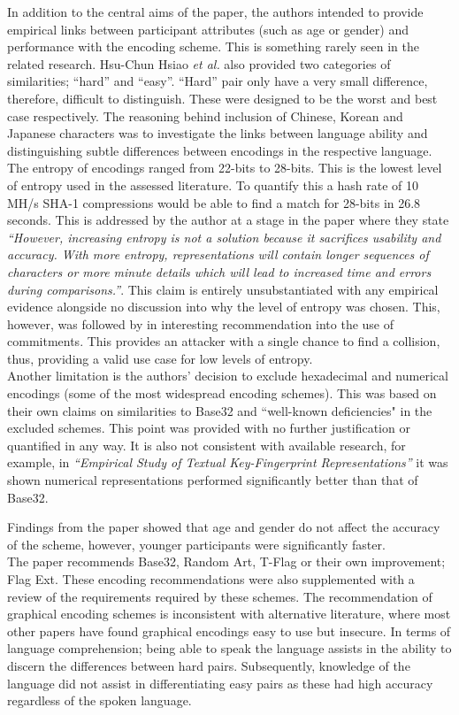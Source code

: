 In addition to the central aims of the paper, the authors intended to provide empirical links between participant attributes (such as age or gender) and performance with the encoding scheme. This is something rarely seen in the related research. Hsu-Chun Hsiao \textit{et al.} also provided two categories of similarities; ``hard'' and ``easy''. ``Hard'' pair only have a very small difference, therefore, difficult to distinguish. These were designed to be the worst and best case respectively. The reasoning behind inclusion of Chinese, Korean and Japanese characters was to investigate the links between language ability and distinguishing subtle differences between encodings in the respective language. The entropy of encodings ranged from 22-bits to 28-bits. This is the lowest level of entropy used in the assessed literature. To quantify this a hash rate of 10 MH/s SHA-1 compressions would be able to find a match for 28-bits in 26.8 seconds. This is addressed by the author at a stage in the paper where they state \textit{``However, increasing entropy is not a solution because it sacrifices usability and accuracy. With more entropy, representations will contain longer sequences of characters or more minute details which will lead to increased time and errors during comparisons.''}. This claim is entirely unsubstantiated with any empirical evidence alongside no discussion into why the level of entropy was chosen. This, however, was followed by in interesting recommendation into the use of commitments\cite{blum1982coin}. This provides an attacker with a single chance to find a collision, thus, providing a valid use case for low levels of entropy.\\
Another limitation is the authors' decision to exclude hexadecimal and numerical encodings (some of the most widespread encoding schemes). This was based on their own claims on similarities to Base32 and ``well-known deficiencies" in the excluded schemes. This point was provided with no further justification or quantified in any way. It is also not consistent with available research, for example, in \textit{``Empirical Study of Textual Key-Fingerprint Representations''}\cite{dechand2016empirical} it was shown numerical representations performed significantly better than that of Base32.

Findings from the paper showed that age and gender do not affect the accuracy of the scheme, however, younger participants were significantly faster. \\
The paper recommends Base32, Random Art, T-Flag or their own improvement; Flag Ext. These encoding recommendations were also supplemented with a review of the requirements required by these schemes. The recommendation of graphical encoding schemes is inconsistent with alternative literature, where most other papers have found graphical encodings easy to use but insecure.
In terms of language comprehension; being able to speak the language assists in the ability to discern the differences between hard pairs. Subsequently, knowledge of the language did not assist in differentiating easy pairs as these had high accuracy regardless of the spoken language.

